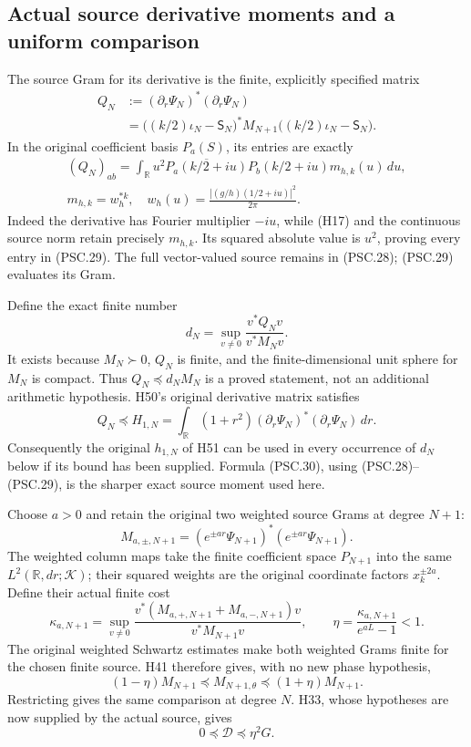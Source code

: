\subsection{Actual source derivative moments and a uniform comparison}

The source Gram for its derivative is the finite, explicitly specified matrix
\[
 \begin{aligned}
 Q_N
 &:=(\partial_r\Psi_N)^*(\partial_r\Psi_N)\\
 &=\bigl((k/2)\iota_N-\mathsf S_N\bigr)^*
       M_{N+1}
       \bigl((k/2)\iota_N-\mathsf S_N\bigr).
 \end{aligned}
 \tag{PSC.28}
\]
In the original coefficient basis \(P_a(S)\), its entries are exactly
\[
 \begin{gathered}
 (Q_N)_{ab}
 =\int_{\mathbb R}u^2
       \overline{P_a(k/2+iu)}P_b(k/2+iu)
       m_{h,k}(u)\,du,\\
 m_{h,k}=w_h^{*k},\quad
 w_h(u)=\frac{|(g/h)(1/2+iu)|^2}{2\pi}.
 \end{gathered}
 \tag{PSC.29}
\]
Indeed the derivative has Fourier multiplier \(-iu\), while (H17) and the continuous source norm retain precisely \(m_{h,k}\). Its squared absolute value is \(u^2\), proving every entry in (PSC.29). The full vector-valued source remains in (PSC.28); (PSC.29) evaluates its Gram.

Define the exact finite number
\[
 d_N=\sup_{v\ne0}\frac{v^*Q_Nv}{v^*M_Nv}.
 \tag{PSC.30}
\]
It exists because \(M_N\succ0\), \(Q_N\) is finite, and the finite-dimensional unit sphere for \(M_N\) is compact. Thus \(Q_N\preceq d_NM_N\) is a proved statement, not an additional arithmetic hypothesis. H50's original derivative matrix satisfies
\[
 Q_N\preceq H_{1,N}
 =\int_{\mathbb R}(1+r^2)(\partial_r\Psi_N)^*
                 (\partial_r\Psi_N)\,dr .
 \tag{PSC.31}
\]
Consequently the original \(h_{1,N}\) of H51 can be used in every occurrence of \(d_N\) below if its bound has been supplied. Formula (PSC.30), using (PSC.28)–(PSC.29), is the sharper exact source moment used here.

Choose \(a>0\) and retain the original two weighted source Grams at degree \(N+1\):
\[
 M_{a,\pm,N+1}
 =(e^{\pm ar}\Psi_{N+1})^*(e^{\pm ar}\Psi_{N+1}).
\]
The weighted column maps take the finite coefficient space \(P_{N+1}\) into the same \(L^2(\mathbb R,dr;\mathcal K)\); their squared weights are the original coordinate factors \(x_k^{\pm2a}\). Define their actual finite cost
\[
 \kappa_{a,N+1}
 =\sup_{v\ne0}
 \frac{v^*(M_{a,+,N+1}+M_{a,-,N+1})v}
      {v^*M_{N+1}v},\qquad
 \eta=\frac{\kappa_{a,N+1}}{e^{aL}-1}<1.
 \tag{PSC.32}
\]
The original weighted Schwartz estimates make both weighted Grams finite for the chosen finite source. H41 therefore gives, with no new phase hypothesis,
\[
 (1-\eta)M_{N+1}\preceq M_{N+1,\theta}
                  \preceq(1+\eta)M_{N+1}.
 \tag{PSC.33}
\]
Restricting gives the same comparison at degree \(N\). H33, whose hypotheses are now supplied by the actual source, gives
\[
 0\preceq\mathscr D\preceq\eta^2G.
 \tag{PSC.34}
\]

